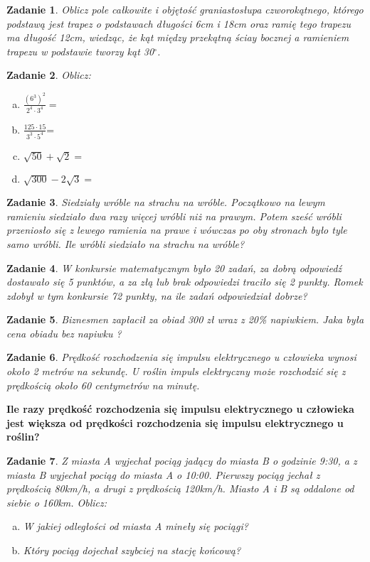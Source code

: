\documentclass[12pt,a4paper]{article}
\newtheorem{zad}{Zadanie}
\begin{document}
	\begin{zad}
		Oblicz pole całkowite i objętość graniastosłupa czworokątnego, którego podstawą jest trapez o podstawach długości 6cm i 18cm oraz ramię tego trapezu ma długość 12cm, wiedząc, że  kąt między przekątną ściay bocznej a ramieniem trapezu w podstawie tworzy kąt 30$^\circ$.
	\end{zad}
\begin{zad}
	Oblicz:
\end{zad}
\begin{enumerate}[a)]
	\item $\frac{(6^3)^2}{2^4\cdot3^4}=$
	\item $\frac{125\cdot15}{3^3\cdot5^4}$=
	\item $\sqrt{50}+\sqrt{2}=$
	\item $\sqrt{300}-2\sqrt{3}=$
\end{enumerate}
\begin{zad}
	Siedziały wróble na strachu na wróble. Początkowo na lewym ramieniu siedziało dwa razy więcej wróbli niż na prawym. Potem sześć wróbli przeniosło się z lewego ramienia na prawe i wówczas po oby stronach było tyle samo wróbli. Ile wróbli siedziało na strachu na wróble?
\end{zad}
\begin{zad}
	W konkursie matematycznym było 20 zadań, za dobrą odpowiedź dostawało się 5 punktów, a za złą lub brak odpowiedzi traciło się 2 punkty. Romek zdobył w tym konkursie 72 punkty, na ile zadań odpowiedział dobrze?
\end{zad}
\begin{zad}
	Biznesmen zapłacił za obiad 300 zł wraz z 20\% napiwkiem. Jaka była cena obiadu bez napiwku ?
\end{zad}
\begin{zad}
	Prędkość rozchodzenia się impulsu elektrycznego u człowieka wynosi około 2 metrów na
	sekundę. U roślin impuls elektryczny może rozchodzić się z prędkością około 60 centymetrów
	na minutę.
\end{zad}
\textbf{Ile razy prędkość rozchodzenia się impulsu elektrycznego u człowieka jest większa od
	prędkości rozchodzenia się impulsu elektrycznego u roślin?}
\begin{zad}
	Z miasta A wyjechał pociąg jadący do miasta B o godzinie 9:30,
	a z miasta B wyjechał pociąg do miasta A o 10:00. Pierwszy pociąg
	jechał z prędkością 80km/h, a drugi z prędkością 120km/h. Miasto A i B są
	oddalone od siebie o 160km. Oblicz:
	\begin{enumerate}[a)]
		\item W jakiej odległości od miasta A mineły się pociągi?
		\item Który pociąg dojechał szybciej na stację końcową?
	\end{enumerate}
\end{zad}
\end{document}
